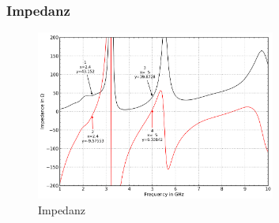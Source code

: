 \subsubsection{Impedanz}
\begin{figure}[h!]
	\centering
	\includegraphics[width=0.7\textwidth]{../fig/plt/crazy_stuff_l4_pcb_v2c_laptop_1a_105_Widerstand_1.png}
	\caption{Impedanz}
	\label{fig:impedanz}
\end{figure}

\newpage
